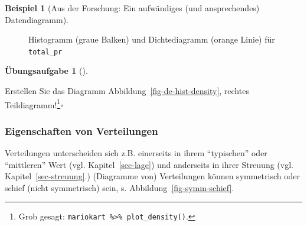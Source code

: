 \documentclass[
  a4paper,
]{scrbook}
\theoremstyle{definition}
\newtheorem{example}{Beispiel}[chapter]
\theoremstyle{definition}
\theoremstyle{definition}
\newtheorem{exercise}{Übungsaufgabe}[chapter]
\theoremstyle{remark}
\begin{document}
\begin{example}[Aus der Forschung: Ein aufwändiges (und ansprechendes)
Datendiagramm]
\begin{figure}
{}

\caption{\label{fig-balken-total-pr-hist-dens}Histogramm (graue Balken)
und Dichtediagramm (orange Linie) für \texttt{total\_pr}}

\end{figure}%

\begin{exercise}[]\protect\hypertarget{exr-plot-density}{}\label{exr-plot-density}

Erstellen Sie das Diagramm Abbildung~\ref{fig-de-hist-density}, rechtes
Teildiagramm!\footnote{Grob gesagt:
  \texttt{mariokart\ \%\textgreater{}\%\ plot\_density()}.}\(\square\)

\end{exercise}

\subsubsection{Eigenschaften von
Verteilungen}\label{eigenschaften-von-verteilungen}

Verteilungen unterscheiden sich z.B. einerseits in ihrem ``typischen''
oder ``mittleren'' Wert (vgl. Kapitel~\ref{sec-lage}) und anderseits in
ihrer Streuung (vgl. Kapitel~\ref{sec-streuung}.) (Diagramme von)
Verteilungen können symmetrisch oder schief (nicht symmetrisch) sein, s.
Abbildung~\ref{fig-symm-schief}.

\begin{figure}

\begin{minipage}{0.50\linewidth}

\end{minipage}
\end{figure}
\end{example}
\end{document}
